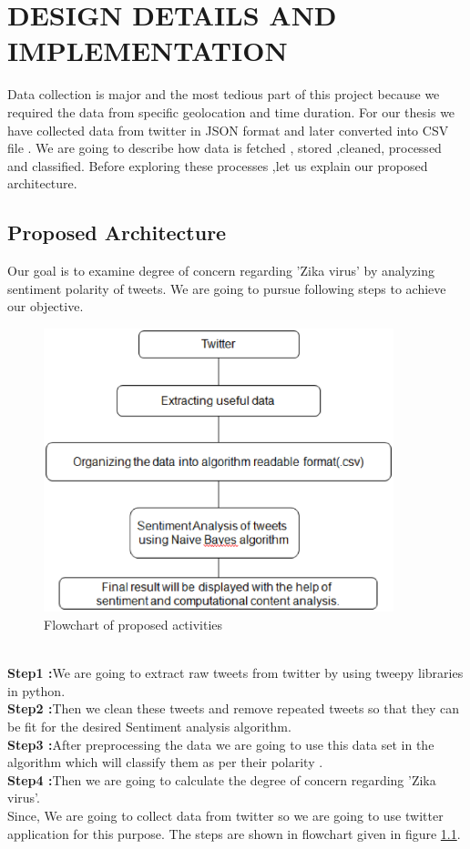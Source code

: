 \chapter{DESIGN DETAILS AND IMPLEMENTATION}
Data collection is major and the most tedious part of this project because we required the data from specific geolocation and time duration. For our thesis we have collected data from twitter in JSON format and later converted into CSV file . We are going to describe how data is fetched , stored ,cleaned, processed and classified. Before exploring these processes ,let us explain our proposed architecture.
\section{Proposed Architecture}
Our goal is to examine degree of concern regarding 'Zika virus' by analyzing sentiment polarity of tweets. We  are going to pursue following steps to achieve our objective.\\
\begin{figure}[h]
\label{11dr1}
\centerline{\includegraphics[width=4in]{11dr1}}
\caption{Flowchart of proposed activities}
\end{figure}\\
{\bf Step1 :}We are going to extract raw tweets from twitter by using tweepy libraries in python.\\
{\bf Step2 :}Then we clean these tweets and remove repeated tweets so that they can be fit for the desired  Sentiment analysis algorithm.\\
{\bf Step3 :}After preprocessing the data we are going to use this data set in the algorithm which will classify them as per their polarity .\\
{\bf Step4 :}Then we are going to calculate the degree of concern regarding 'Zika virus'.\\
Since, We are going to collect data from twitter so we are going to use twitter application for this purpose.
 The steps are shown in flowchart given in figure \ref{11dr1}.
